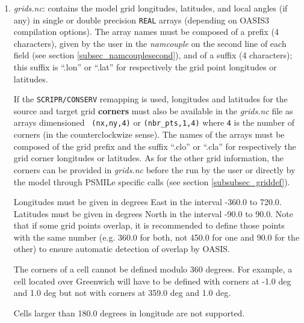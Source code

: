 \begin{enumerate}

\item {\em grids.nc}: contains the model grid
  longitudes, latitudes, and local angles (if any) in single or double
  precision {\tt REAL} arrays (depending on OASIS3 compilation
  options). The array names must be composed of a prefix (4
  characters), given by the user in the {\it namcouple} on the second
  line of each field (see section \ref{subsec_namcouplesecond}), and
  of a suffix (4 characters); this suffix is ``.lon'' or ``.lat'' for
  respectively the grid point longitudes or latitudes.

  If the {\tt SCRIPR/CONSERV} remapping is used, longitudes and
  latitudes for the source and target grid {\bf corners} must also be
  available in the {\em grids.nc} file as arrays dimensioned {\tt
    (nx,ny,4)} or {\tt (nbr\_pts,1,4)} where {\tt 4} is the number
  of corners (in the counterclockwize sense). The names of the arrays
  must be composed of the grid prefix and the suffix ``.clo'' or
  ``.cla'' for respectively the grid corner longitudes or latitudes.
  As for the other grid information, the corners can be provided in
  {\em grids.nc} before the run by the user or directly by the model
  through PSMILe specific calls (see section \ref{subsubsec_griddef}).

 
 Longitudes must be given in degrees East in the interval -360.0 to
 720.0. Latitudes must be given in degrees North in the interval -90.0
 to 90.0. Note that if some grid points overlap, it is recommended to
 define those points with the same number (e.g. 360.0 for both, not
 450.0 for one and 90.0 for the other) to ensure automatic detection
 of overlap by OASIS. 
 
 The corners of a cell cannot be defined modulo
 360 degrees. For example, a cell located over Greenwich will have to be defined
 with corners at -1.0 deg and 1.0 deg but not with corners at 359.0 deg and 1.0 deg.
 
 Cells larger than 180.0 degrees in longitude are not supported. 


\end{enumerate}
